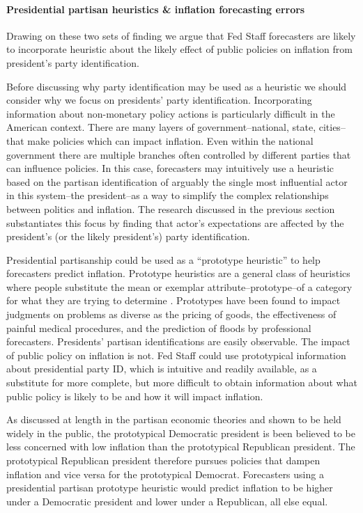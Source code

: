 \documentclass[a4paper]{article}
\begin{document}
\paragraph{Presidential partisan heuristics \& inflation forecasting errors}

Drawing on these two sets of finding we argue that Fed Staff forecasters are likely to incorporate heuristic about the likely effect of public policies on inflation from president's party identification.

Before discussing why party identification may be used as a heuristic we should consider why we focus on presidents' party identification. Incorporating information about non-monetary policy actions is particularly difficult in the American context. There are many layers of government--national, state, cities--that make policies which can impact inflation. Even within the national government there are multiple branches often controlled by different parties that can influence policies. In this case, forecasters may intuitively use a heuristic based on the partisan identification of arguably the single most influential actor in this system--the president--as a way to simplify the complex relationships between politics and inflation. The research discussed in the previous section substantiates this focus by finding that actor's expectations are affected by the president's (or the likely president's) party identification.

Presidential partisanship could be used as a ``prototype heuristic'' to help forecasters predict inflation. Prototype heuristics are a general class of heuristics where people substitute the mean or exemplar attribute--prototype--of a category for what they are trying to determine \cite[1463]{kahneman2003}. Prototypes have been found to impact judgments on problems as diverse as the pricing of goods, the effectiveness of painful medical procedures, and the prediction of floods by professional forecasters. Presidents' partisan identifications are easily observable. The impact of public policy on inflation is not. Fed Staff could use prototypical information about presidential party ID, which is intuitive and readily available, as a substitute for more complete, but more difficult to obtain information about what public policy is likely to be and how it will impact inflation. 

As discussed at length in the partisan economic theories and shown to be held widely in the public, the prototypical Democratic president is been believed to be less concerned with low inflation than the prototypical Republican president. The prototypical Republican president therefore pursues policies that dampen inflation and vice versa for the prototypical Democrat. Forecasters using a presidential partisan prototype heuristic would predict inflation to be higher under a Democratic president and lower under a Republican, all else equal. 
\end{document}
